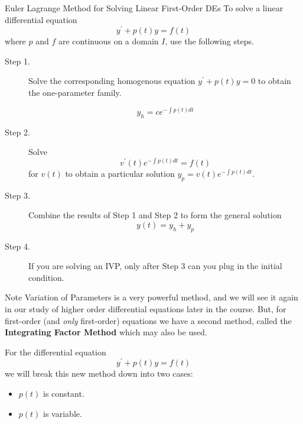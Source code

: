 \documentclass{beamer}
\begin{document}
\begin{frame}
\begin{block}{Euler Lagrange Method for Solving Linear First-Order DEs}
To solve a linear differential equation
\begin{equation*}
y^\prime + p(t) y = f(t)
\end{equation*}
where $p$ and $f$ are continuous on a domain $I$, use the following steps.
\begin{description}
\item[Step 1.] Solve the corresponding homogenous equation $y^\prime+p(t)y=0$ to obtain the one-parameter family.

\vspace{-3mm}
\begin{equation*}
y_h=c e^{-\int p(t) dt}
\end{equation*}\vspace{-8mm}
\item[Step 2.] Solve
\begin{equation*}
v^\prime(t) e^{-\int p(t)dt} = f(t)
\end{equation*}
for $v(t)$ to obtain a particular solution $y_p = v(t) e^{-\int p(t)dt}$.
\item[Step 3.] Combine the results of Step 1 and Step 2 to form the general solution
\begin{equation*}
y(t)=y_h + y_p
\end{equation*}
\item[Step 4.] If you are solving an IVP, only after Step 3 can you plug in the initial condition.
\end{description}
\end{block}
\end{frame}

\begin{frame}
\begin{block}{Note}
Variation of Parameters is a very powerful method, and we will see it again in our study of higher order differential equations later in the course. But, for first-order (and \emph{only} first-order) equations we have a second method, called the \textbf{Integrating Factor Method} which may also be used. \pause

\vspace{2mm}
For the differential equation
\begin{equation*}
y^\prime + p(t) y = f(t)
\end{equation*}
we will break this new method down into two cases:
\begin{itemize}
\item $p(t)$ is constant.
\item $p(t)$ is variable.
\end{itemize}
\end{block}
\end{frame}
\end{document}
